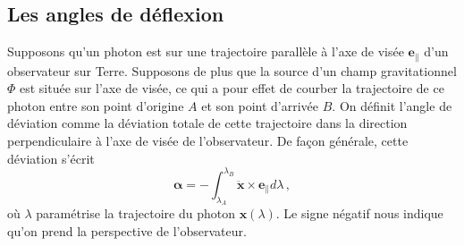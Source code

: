 \subsection{Les angles de déflexion}

Supposons qu'un photon est sur une trajectoire parallèle à l'axe de 
visée $\mathbf{e}_{\parallel}$ d'un observateur sur Terre. 
Supposons de plus que la source d'un champ gravitationnel $\Phi$ est située sur l'axe de visée, 
ce qui a pour effet de courber la 
trajectoire de ce photon entre son point d'origine $A$ et son point d'arrivée $B$.
On définit l'angle de déviation comme la déviation totale de cette trajectoire 
dans la direction perpendiculaire à l'axe de visée de l'observateur. 
De façon générale, cette déviation s'écrit
\begin{equation}\label{eq:intro alpha}
        \boldsymbol{ \alpha} = - \int_{\lambda_A}^{\lambda_B} \ddot{\mathbf{x}} \times \mathbf{e}_{\parallel} d\lambda\, ,
\end{equation}
où $\lambda$ paramétrise la trajectoire du photon $\mathbf{x}(\lambda)$. 
Le signe négatif nous indique qu'on prend la perspective de l'observateur. 

